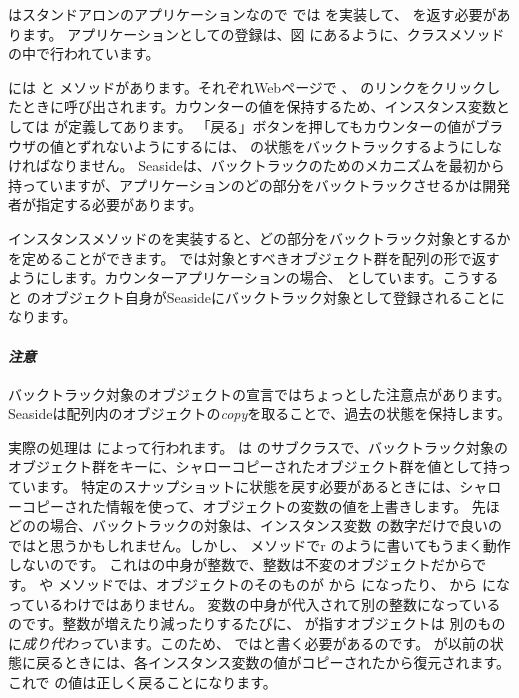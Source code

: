 \documentclass[a4paper,10pt,twoside]{book}
\begin{document}
  はスタンドアロンのアプリケーションなので  では   を実装して、 を返す必要があります。
 アプリケーションとしての登録は、図 にあるように、クラスメソッド の中で行われています。 

 には  と メソッドがあります。それぞれWebページで \link{++} 、 \link{--\,--} のリンクをクリックしたときに呼び出されます。カウンターの値を保持するため、インスタンス変数としては が定義してあります。
「戻る」ボタンを押してもカウンターの値がブラウザの値とずれないようにするには、 の状態をバックトラックするようにしなければなりません。
Seasideは、バックトラックのためのメカニズムを最初から持っていますが、アプリケーションのどの部分をバックトラックさせるかは開発者が指定する必要があります。

インスタンスメソッドのを実装すると、どの部分をバックトラック対象とするかを定めることができます。
 では対象とすべきオブジェクト群を配列の形で返すようにします。カウンターアプリケーションの場合、 としています。こうすると  のオブジェクト自身がSeasideにバックトラック対象として登録されることになります。

\paragraph{\emph{注意}}
バックトラック対象のオブジェクトの宣言ではちょっとした注意点があります。
Seasideは配列内のオブジェクトの\emph{copy}を取ることで、過去の状態を保持します。

実際の処理は  によって行われます。 は  のサブクラスで、バックトラック対象のオブジェクト群をキーに、シャローコピーされたオブジェクト群を値として持っています。
特定のスナップショットに状態を戻す必要があるときには、シャローコピーされた情報を使って、オブジェクトの変数の値を上書きします。
先ほどのの場合、バックトラックの対象は、インスタンス変数 の数字だけで良いのではと思うかもしれません。しかし、   メソッドでr のように書いてもうまく動作しないのです。
これはの中身が整数で、整数は不変のオブジェクトだからです。
  や  メソッドでは、オブジェクトのそのものが から  になったり、 から になっているわけではありません。
  変数の中身が代入されて別の整数になっているのです。整数が増えたり減ったりするたびに、  が指すオブジェクトは 別のものに\emph{成り代わって}います。このため、 ではと書く必要があるのです。 \mbox{} が以前の状態に戻るときには、各インスタンス変数の値がコピーされた\mbox{}から復元されます。これで  の値は正しく戻ることになります。
\end{document}
